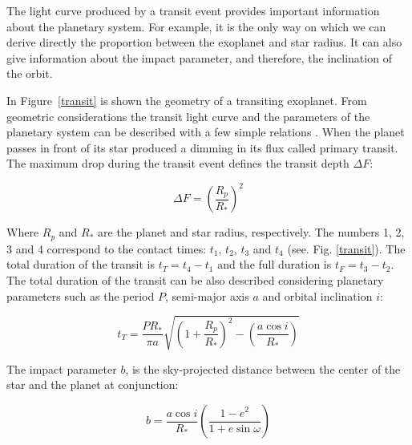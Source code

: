
The light curve produced by a transit event provides important information about the planetary system. For example, it is the only way on which we can derive directly the proportion between the exoplanet and star radius. It can also give information about the impact parameter, and therefore, the inclination of the orbit. 

In Figure~\ref{transit} is shown the geometry of a transiting exoplanet. From geometric considerations the transit light curve and the parameters of the planetary system can be described with a few simple relations \cite{Seager2003,Winn2010}.  When the planet passes in front of its star produced a dimming in its flux called primary transit. The maximum drop during the transit event defines the transit depth $\Delta{F}$:

\begin{equation}
    \Delta{F} = \left(\frac{R_{p}}{R_{*}}\right)^2 
\end{equation}

Where $R_{p}$ and $R_{*}$ are the planet and star radius, respectively. The numbers 1, 2, 3 and 4 correspond to the contact times: $t_{1}$, $t_{2}$, $t_{3}$ and $t_{4}$ (see. Fig. \ref{transit}). The total duration of the transit is $t_{T} = t_{4}-t_{1}$ and the full duration is $t_{F}=t_{3}-t_{2}$. The total duration of the transit can be also described considering planetary parameters such as the period $P$, semi-major axis $a$ and orbital inclination $i$:

\begin{equation}
    t_{T} = \frac{PR_{*}}{\pi a} \sqrt{\left(1+\frac{R_{p}}{R_{*}}\right)^2-\left(\frac{a\cos i}{R_{*}}\right)}
\end{equation}

The impact parameter $b$, is the sky-projected distance between the center of the star and the planet at conjunction:

\begin{equation}
    b = \frac{a\cos{i}}{R_{*}}\left(\frac{1-e^2}{1+e\sin{\omega}}\right)
\label{impact_param}
\end{equation}


